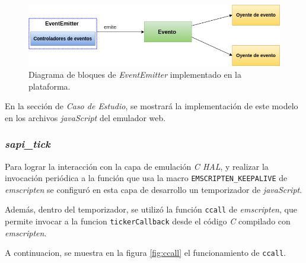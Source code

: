\begin{figure}[ht]
	\centering
	\includegraphics[scale=.49]{./Figures/EventemitterNodejs.png}
	\caption{Diagrama de bloques de \textit{EventEmitter} implementado en la plataforma.}
	\label{fig:EventemitterNodejs}
\end{figure}

En la sección de \textit{Caso de Estudio}, se mostrará la implementación de este modelo en los archivos \textit{javaScript} del emulador web.

\subsubsection{\textit{\textbf{sapi\_tick}}}

Para lograr la interacción con la capa de emulación \textit{C HAL}, y realizar la invocación periódica a la función que usa la macro \texttt{EMSCRIPTEN\_KEEPALIVE} de \textit{emscripten} se configuró en esta capa de desarrollo un temporizador de \textit{javaScript}.

Además, dentro del temporizador, se utilizó la función \texttt{ccall} de \textit{emscripten}, que permite invocar a la funcion \texttt{tickerCallback} desde el código \textit{C} compilado con \textit{emscripten}. 


A continuacion, se muestra en la figura  \ref{fig:ccall} el funcionamiento de \texttt{ccall}. 
\hfill \break
\hfill \break

